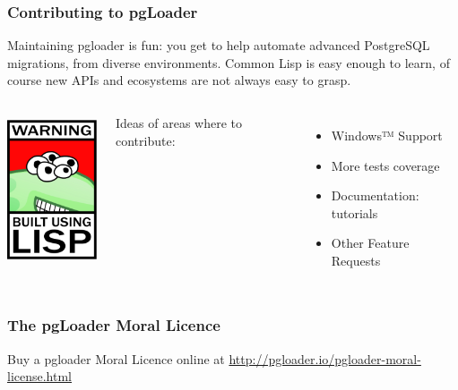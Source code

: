 \documentclass{beamer}
\begin{document}
\begin{frame}[fragile]
  \frametitle{Contributing to pgLoader}

  Maintaining pgloader is fun: you get to help automate advanced PostgreSQL
  migrations, from diverse environments. Common Lisp is easy enough to
  learn, of course new APIs and ecosystems are not always easy to grasp.
  
  \begin{columns}[c]
    \begin{center}
      \includegraphics[height=12em]{lisplogo_warning2_256.png}
    \end{center}

    Ideas of areas where to contribute:
      \begin{itemize}
      \item Windows™ Support
      \item More tests coverage
      \item Documentation: tutorials
      \item Other Feature Requests
    \end{itemize}
  \end{columns}  
\end{frame}

{
  \begin{frame}
    \frametitle{The pgLoader Moral Licence}

    \begin{Large}
      \begin{center}
        Buy a pgloader Moral Licence online at
        \newline
        \url{http://pgloader.io/pgloader-moral-license.html}
      \end{center}
    \end{Large}
    \vfill
  \end{frame}
}
\end{document}
